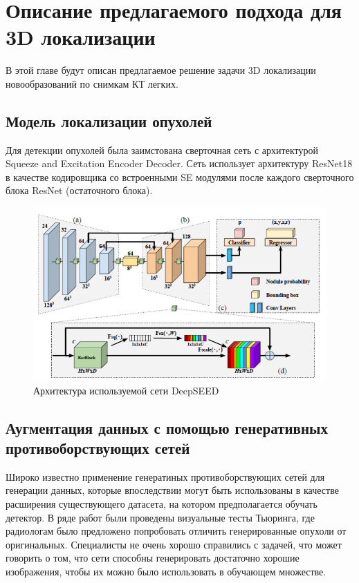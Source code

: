 \chapter{Описание предлагаемого подхода для 3D локализации}

В этой главе будут описан предлагаемое решение задачи 3D локализации новообразований по снимкам КТ легких.

\section{Модель локализации опухолей}

Для детекции опухолей была заимстована сверточная сеть с архитектурой Squeeze and Excitation Encoder Decoder. Сеть использует архитектуру ResNet18 в качестве кодировщика со встроенными SE модулями после каждого сверточного блока ResNet (остаточного блока). 

\begin{figure}[!h]
\includegraphics[width=\linewidth]{deep-seed-architecture.png}
\caption{Архитектура используемой сети DeepSEED}\label{deep-seed-architecture}
\centering
\end{figure}


\section{Аугментация данных с помощью генеративных противоборствующих сетей}

Широко известно применение генератиных противоборствующих сетей для генерации данных, которые впоследствии могут быть использованы в качестве расширения существующего датасета, на котором предполагается обучать детектор. В ряде работ были проведены визуальные тесты Тьюринга, где радиологам было предложено попробовать отличить генерированные опухоли от оригинальных. Специалисты не очень хорошо справились с задачей, что может говорить о том, что сети способны генерировать достаточно хорошие изображения, чтобы их можно было использовать в обучающем множестве.

